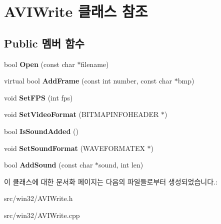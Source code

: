 \hypertarget{class_a_v_i_write}{}\section{A\+V\+I\+Write 클래스 참조}
\label{class_a_v_i_write}
\subsection*{Public 멤버 함수}
\begin{DoxyCompactItemize}
\item 
\mbox{\label{class_a_v_i_write_a2b4ef2aeeef846bcb12ef58189043eb1}} 
bool {\bfseries Open} (const char $\ast$filename)
\item 
\mbox{\label{class_a_v_i_write_a904b7f02ff6ecfeeaeec6e1c82f1592a}} 
virtual bool {\bfseries Add\+Frame} (const int number, const char $\ast$bmp)
\item 
\mbox{\label{class_a_v_i_write_a3beb976b918287e0592ab4feebd9ce59}} 
void {\bfseries Set\+F\+PS} (int fps)
\item 
\mbox{\label{class_a_v_i_write_a1da91adeefacf0dd4655f5029875c5d6}} 
void {\bfseries Set\+Video\+Format} (B\+I\+T\+M\+A\+P\+I\+N\+F\+O\+H\+E\+A\+D\+ER $\ast$)
\item 
\mbox{\label{class_a_v_i_write_a7e14c1640c3c888c2b0a0b042c0d5b8f}} 
bool {\bfseries Is\+Sound\+Added} ()
\item 
\mbox{\label{class_a_v_i_write_a8d864e6e2cea4147ffa6f24d69fbe339}} 
void {\bfseries Set\+Sound\+Format} (W\+A\+V\+E\+F\+O\+R\+M\+A\+T\+EX $\ast$)
\item 
\mbox{\label{class_a_v_i_write_a63b7d54c048e517bbfad0ae2004d9861}} 
bool {\bfseries Add\+Sound} (const char $\ast$sound, int len)
\end{DoxyCompactItemize}


이 클래스에 대한 문서화 페이지는 다음의 파일들로부터 생성되었습니다.\+:\begin{DoxyCompactItemize}
\item 
src/win32/A\+V\+I\+Write.\+h\item 
src/win32/A\+V\+I\+Write.\+cpp\end{DoxyCompactItemize}

